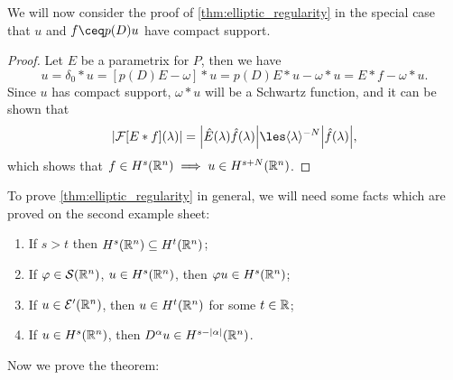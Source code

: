 We will now consider the proof of \cref{thm:elliptic_regularity} in the special case that $u$ and $f \ceq p(D)u$ have compact support. 
\begin{proof}
	Let $E$ be a parametrix for $P$, then we have
	\[
	u= \delta_0 * u = [p(D) E - \omega] * u = p(D)E * u - \omega * u = E * f - \omega * u. 
	\]
	Since $u$ has compact support, $\omega * u$ will be a Schwartz function, and it can be shown that
	\[
	\abs{\FF[E * f](\lambda)} = \abs{\hat E(\lambda) \hat f(\lambda)} \les \ang{\lambda}^{-N} \abs{\hat f(\lambda)}, 
	\]
	which shows that $f \in H^s(\mathbb R^n) \implies u \in H^{s + N}(\mathbb R^n)$. 
\end{proof}

To prove \cref{thm:elliptic_regularity} in general, we will need some facts which are proved on the second example sheet:
\begin{enumerate}
	\item If $s > t$ then $H^s(\mathbb R^n) \subseteq H^t(\mathbb R^n)$;
	\item If $\varphi \in \mathcal S(\mathbb R^n)$, $u \in H^s(\mathbb R^n)$, then $\varphi u \in H^s(\mathbb R^n)$;
	\item If $u \in \mathcal E'(\mathbb R^n)$, then $u \in H^t(\mathbb R^n)$ for some $t \in \mathbb R$;
	\item If $u \in H^s(\mathbb R^n)$, then $D^\alpha u \in H^{s - \abs{\alpha}}(\mathbb R^n)$. 
\end{enumerate}
Now we prove the theorem:
